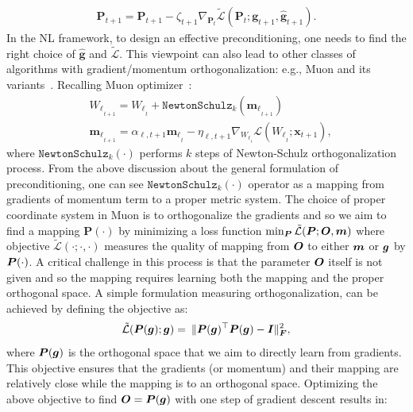 \begin{align}
    \boldsymbol{P}_{t+1} = \boldsymbol{P}_{t+1} - \zeta_{t+1} \nabla_{\boldsymbol{P}_{t}} \tilde{\mathcal{L}} \left(\boldsymbol{P}_{t}; {\boldsymbol{g}}_{t+1} , \hat{\boldsymbol{g}}_{t+1}  \right).
\end{align}
In the NL framework, to design an effective preconditioning, one needs to find the right choice of  $\hat{\boldsymbol{g}}$ and  $\tilde{\mathcal{L}}.$
This viewpoint  can also lead to other classes of algorithms with gradient/momentum orthogonalization: e.g., Muon and its variants~\citep{jordanmuon, cesista2025spectralclipping, ManifoldMuon2025Keigwin}. Recalling Muon optimizer~\citep{jordanmuon}:
\begin{align}\nonumber
    &{W_{\ell}}_{_{t+1}} = {W_{\ell}}_{_{t}} + \texttt{NewtonSchulz}_k\left({\boldsymbol{m}_{\ell}}_{_{t+1}}\right)\\ \label{eq:muon1}
    &{\boldsymbol{m}_{\ell}}_{_{t+1}} = \alpha_{\ell, t+1} {\boldsymbol{m}_{\ell}}_{_{t}} - \eta_{\ell, t+1} \nabla_{{W_{\ell}}_{_{t}}} \mathcal{L}\left({W_{\ell}}_{_{t}}; \boldsymbol{x}_{t+1}\right),
\end{align}
where $\texttt{NewtonSchulz}_k(\cdot)$ performs $k$ steps of Newton-Schulz orthogonalization process. From the above discussion about the general formulation of preconditioning, one can see $\texttt{NewtonSchulz}_k(\cdot)$ operator as a mapping from gradients of momentum term to a proper metric system. The choice of proper coordinate system in Muon is to orthogonalize the gradients and so we aim to find a mapping $\boldsymbol{P}\left(\cdot \right)$ by minimizing a loss function $\min_{\boldsymbol{P}}\tilde{\mathcal{L}} (\boldsymbol{P}; \boldsymbol{O}, \boldsymbol{m})$
where objective $\tilde{\mathcal{L}}(\cdot; \cdot, \cdot)$ measures the quality of mapping from $\boldsymbol{O}$ to either $\boldsymbol{m}$ or $\boldsymbol{g}$ by $\boldsymbol{P}(\cdot)$. A critical challenge in this process is that the parameter $\boldsymbol{O}$ itself is not given and so the mapping requires learning both the mapping and the proper orthogonal space. A simple formulation measuring orthogonalization, can be achieved by defining the objective as:
\begin{align}\label{eq:muon-motivation}
    \tilde{\mathcal{L}}(\boldsymbol{P}(\boldsymbol{g}); \boldsymbol{g}) =  \: \| \boldsymbol{P}(\boldsymbol{g})^{\top} \boldsymbol{P}(\boldsymbol{g}) - \boldsymbol{I} \|^2_{\boldsymbol{F}}, 
\end{align}
where $\boldsymbol{P}(\boldsymbol{g})$ is the orthogonal space that we aim to directly learn from gradients. This objective ensures that the gradients (or momentum) and their mapping are relatively close while the mapping is to an orthogonal space.   Optimizing the above objective to find $\boldsymbol{O} = \boldsymbol{P}(\boldsymbol{g})$ with one step of gradient descent results in: 
